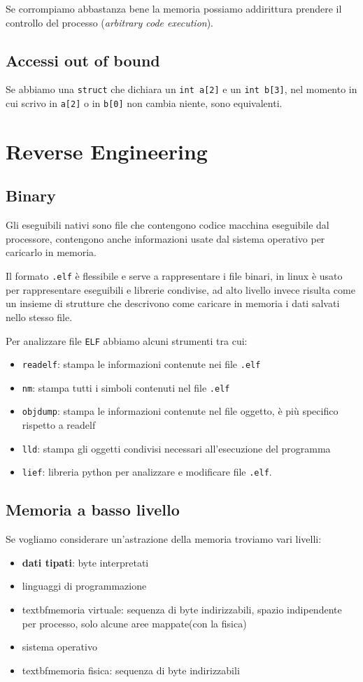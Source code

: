 Se corrompiamo abbastanza bene la memoria possiamo addirittura prendere il controllo del
processo (\textit{arbitrary code execution}).
\subsection{Accessi out of bound}
Se abbiamo una \texttt{struct} che dichiara un \texttt{int a[2]} e un \texttt{int b[3]},
nel momento in cui scrivo in \texttt{a[2]} o in \texttt{b[0]} non cambia niente,
sono equivalenti.
\section{Reverse Engineering}
\subsection{Binary}
Gli eseguibili nativi sono file che contengono codice macchina eseguibile dal
processore, contengono anche informazioni usate dal sistema operativo per caricarlo
in memoria.

Il formato \texttt{.elf} è flessibile e serve a rappresentare i file binari,
in linux è usato per rappresentare eseguibili e librerie condivise, ad alto livello
invece risulta come un insieme di strutture che descrivono come caricare in memoria
i dati salvati nello stesso file.

Per analizzare file \texttt{ELF} abbiamo alcuni strumenti tra cui:
\begin{itemize}
    \item \texttt{readelf}: stampa le informazioni contenute nei file \texttt{.elf}
    \item \texttt{nm}: stampa tutti i simboli contenuti nel file \texttt{.elf}
    \item \texttt{objdump}: stampa le informazioni contenute nel file oggetto, è più specifico rispetto a readelf
    \item \texttt{lld}: stampa gli oggetti condivisi necessari all'esecuzione del programma
    \item \texttt{lief}: libreria python per analizzare e modificare file \texttt{.elf}.
\end{itemize}

\subsection{Memoria a basso livello}
Se vogliamo considerare un'astrazione della memoria troviamo vari livelli:
 \begin{itemize}
  \item \textbf{dati tipati}: byte interpretati
  \item linguaggi di programmazione
    \item textbf{memoria virtuale}: sequenza di byte indirizzabili, spazio indipendente per processo, solo alcune aree mappate(con la fisica)
    \item sistema operativo
    \item textbf{memoria fisica}: sequenza di byte indirizzabili
\end{itemize}

